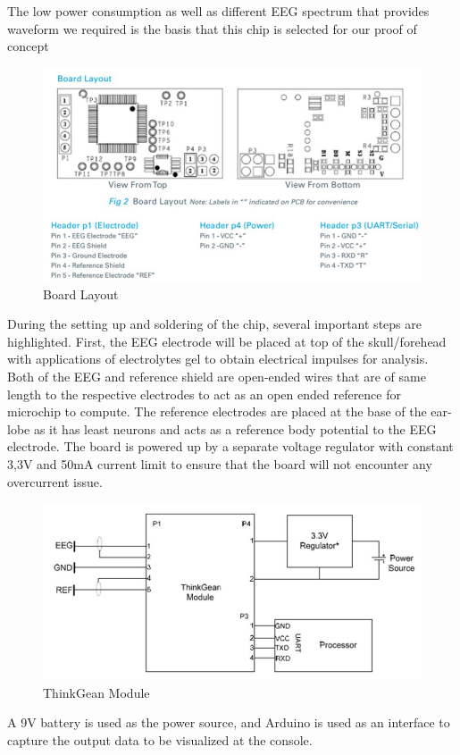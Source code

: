 The low power consumption as well as different EEG spectrum that provides waveform we required is the basis that this chip is selected for our proof of concept

\begin{figure}[H]
	\centering
	\includegraphics[width=0.7\linewidth]{jiahuipic3.jpg}
	\caption{Board Layout}
\end{figure}

During the setting up and soldering of the chip, several important steps are highlighted. First, the EEG electrode will be placed at top of the skull/forehead with applications of electrolytes gel to obtain electrical impulses for analysis. Both of the EEG and reference shield are open-ended wires that are of same length to the respective electrodes to act as an open ended reference for microchip to compute. The reference electrodes are placed at the base of the ear-lobe as it has least neurons and acts as a reference body potential to the EEG electrode. The board is powered up by a separate voltage regulator with constant 3,3V and 50mA current limit to ensure that the board will not encounter any overcurrent issue.

\begin{figure}[H]
	\centering
	\includegraphics[width=0.7\linewidth]{jiahuipic4.jpg}
	\caption{ThinkGean Module}
\end{figure}

A 9V battery is used as the power source, and Arduino is used as an interface to capture the output data to be visualized at the console. 

